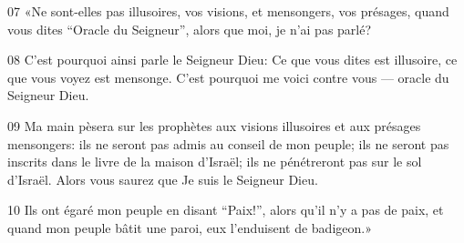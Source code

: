 
07 «Ne sont-elles pas illusoires, vos visions, et mensongers, vos présages, quand vous dites “Oracle du Seigneur”, alors que moi, je n’ai pas parlé?

08 C’est pourquoi ainsi parle le Seigneur Dieu: Ce que vous dites est illusoire, ce que vous voyez est mensonge. C’est pourquoi me voici contre vous --- oracle du Seigneur Dieu.

09 Ma main pèsera sur les prophètes aux visions illusoires et aux présages mensongers: ils ne seront pas admis au conseil de mon peuple; ils ne seront pas inscrits dans le livre de la maison d’Israël; ils ne pénétreront pas sur le sol d’Israël. Alors vous saurez que Je suis le Seigneur Dieu.

10 Ils ont égaré mon peuple en disant “Paix!”, alors qu’il n’y a pas de paix, et quand mon peuple bâtit une paroi, eux l’enduisent de badigeon.»
